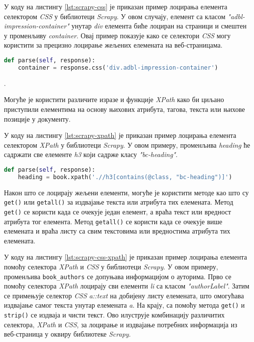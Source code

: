 \documentclass[12pt,oneside]{memoir}
\begin{document}
У коду на листингу \ref{lst:scrapy-css} је приказан пример лоцирања елемента селектором \textit{CSS} у библиотеци \textit{Scrapy}. У овом случају, елемент са класом \textit{"adbl-impression-container"} унутар \textit{div} елемента биће лоциран на страници и смештен у променљиву \textit{container}. Овај пример показује како се селектори \textit{CSS}   могу користити за прецизно лоцирање жељених елемената на веб-страницама.
\begin{lstlisting}[language=Python, caption={Лоцирање елемента селектором \textit{CSS}}, label={lst:scrapy-css}]
def parse(self, response):
    container = response.css('div.adbl-impression-container')
\end{lstlisting}.

Могуће је користити различите изразе и функције \textit{XPath} како би циљано приступили елементима на основу њихових атрибута, тагова, текста или њихове позиције у документу.

У коду на листингу \ref{lst:scrapy-xpath} је приказан пример лоцирања елемента селектором \textit{XPath} у библиотеци \textit{Scrapy}. У овом примеру, променљива \textit{heading} ће садржати све елементе \textit{h3} који садрже класу \textit{"bc-heading"}. 
\begin{lstlisting}[language=Python, caption={Лоцирање елемента селектором \textit{XPath}}, label={lst:scrapy-xpath}]
def parse(self, response):
    heading = book.xpath('.//h3[contains(@class, "bc-heading")]')
\end{lstlisting}

Након што се лоцирају жељени елементи, могуће је користити методе као што су \texttt{get()} или \texttt{getall()} за издвајање текста или атрибута тих елемената. Метод \texttt{get()} се користи када се очекује један елемент, а враћа текст или вредност атрибута тог елемента. Метод \texttt{getall()} се користи када се очекује више елемената и враћа листу са свим текстовима или вредностима атрибута тих елемената. 

У коду на листингу \ref{lst:scrapy-css-xpath} је приказан пример лоцирања елемента помоћу селектора \textit{XPath} и \textit{CSS} у библиотеци \textit{Scrapy}. У овом примеру, променљива \texttt{book\_authors} се допуњава информацијом о ауторима. Прво се помоћу селектора \textit{XPath}  лоцирају сви елементи \textit{li} са класом \textit{"authorLabel"}. Затим се примењује селектор \textit{CSS} \textit{a::text} на добијену листу елемената, што омогућава издвајање самог текста унутар елемената \textit{a}. На крају, са помоћу метода \texttt{get()} и \texttt{strip()} се издваја и чисти текст. Ово илуструје комбинацију различитих селектора, \textit{XPath} и \textit{CSS}, за лоцирање и издвајање потребних информација из веб-страница у оквиру библиотеке \textit{Scrapy}.
\end{document}

